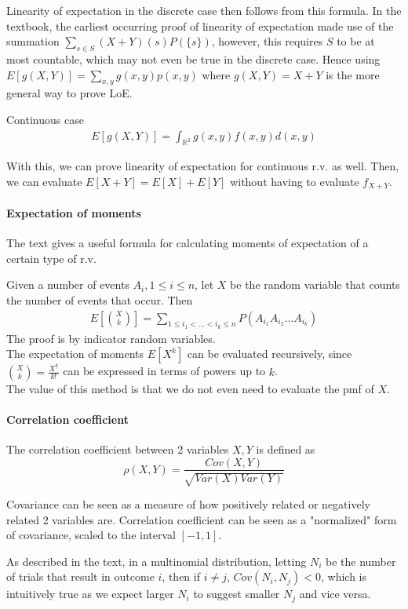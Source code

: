 \documentclass{article}
\begin{document}
Linearity of expectation in the discrete case then follows from this formula. In the textbook, the earliest occurring proof of linearity of expectation made use of the summation $\sum_{s\in S}(X+Y)(s)P(\{s\})$, however, this requires $S$ to be at most countable, which may not even be true in the discrete case. Hence using $E[g(X, Y)] = \sum_{x,y}g(x,y)p(x,y)$ where $g(X,Y) = X+Y$ is the more general way to prove LoE.

Continuous case
\begin{align*}
	E[g(X, Y)] = \int_{\mathbb{R}^2}g(x,y)f(x,y)d(x,y)
\end{align*}

With this, we can prove linearity of expectation for continuous r.v. as well. Then, we can evaluate $E[X+Y] = E[X] + E[Y]$ without having to evaluate $f_{X+Y}$.

\paragraph{Expectation of moments} The text gives a useful formula for calculating moments of expectation of a certain type of r.v.

Given a number of events $A_i, 1\leq i\leq n$, let $X$ be the random variable that counts the number of events that occur. Then 
\begin{align*}
	E\left[\binom{X}{k}\right] = \sum_{1\leq i_1<\dots<i_k\leq n}P(A_{i_1}A_{i_2}\dots A_{i_k})
\end{align*}
The proof is by indicator random variables.\\
The expectation of moments $E[X^k]$ can be evaluated recursively, since $\binom{X}{k} = \frac{X^{\underline{k}}}{k!}$ can be expressed in terms of powers up to $k$.\\
The value of this method is that we do not even need to evaluate the pmf of $X$.

\paragraph{Correlation coefficient} The correlation coefficient between 2 variables $X,Y$ is defined as 
\[\rho(X,Y)=\frac{Cov(X,Y)}{\sqrt{Var(X)Var(Y)}}\]

Covariance can be seen as a measure of how positively related or negatively related 2 variables are. Correlation coefficient can be seen as a "normalized" form of covariance, scaled to the interval $[-1,1]$.

As described in the text, in a multinomial distribution, letting $N_i$
be the number of trials that result in outcome $i$, then if $i\neq j$, $Cov(N_i,N_j) < 0$, which is intuitively true as we expect larger $N_i$ to suggest smaller $N_j$ and vice versa.
\end{document}
